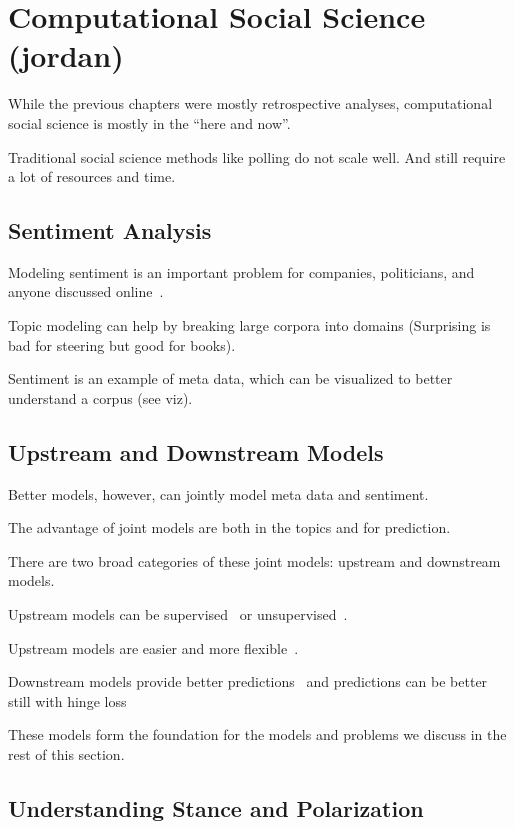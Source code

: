 
\chapter{Computational Social Science (jordan)}
\label{ch:css}

While the previous chapters were mostly retrospective analyses, computational
social science is mostly in the ``here and now''.

 Traditional social science methods like polling do not scale well. And still
 require a lot of resources and time.

\section{Sentiment Analysis}

Modeling sentiment is an important problem for companies, politicians,
and anyone discussed online~\citep{pang-08}.

Topic modeling can help by breaking large corpora into domains
(Surprising is bad for steering but good for books).

Sentiment is an example of meta data, which can be visualized to
better understand a corpus (see viz).

\section{Upstream and Downstream Models}

Better models, however, can jointly model meta data and sentiment.

The advantage of joint models are both in the topics and for
prediction.

There are two broad categories of these joint models: upstream and
downstream models.

Upstream models can be supervised~\citep{mimno-08} or
unsupervised~\citep{lin-09}.

Upstream models are easier and more flexible~\citep{stewart-14}.

Downstream models provide better predictions~\citep{blei-07b} and
predictions can be better still with hinge loss~\citep{zhu-09}

These models form the foundation for the models and problems we
discuss in the rest of this section.

\section{Understanding Stance and Polarization}

